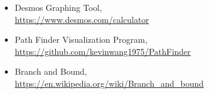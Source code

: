 \documentclass[article, a4paper, 12pt, oneside]{memoir}
\begin{document}
\begin{itemize}
	\item Desmos Graphing Tool,\\
	\color{blue} \underline{\href{https://www.desmos.com/calculator}{https://www.desmos.com/calculator}} \color{black}
	\item Path Finder Visualization Program,\\
	\color{blue} \underline{\href{https://github.com/kevinwang1975/PathFinder}{https://github.com/kevinwang1975/PathFinder}} \color{black}
	\item Branch and Bound,\\
	\color{blue} \underline{\href{https://en.wikipedia.org/wiki/Branch_and_bound}{https://en.wikipedia.org/wiki/Branch\_and\_bound}} \color{black}
\end{itemize}
\end{document}
